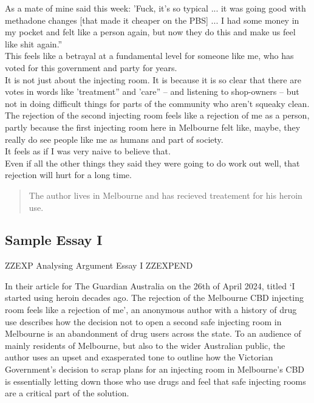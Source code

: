 \documentclass[a4paper]{article}
\begin{document}
As a mate of mine said this week: 'Fuck, it’s so typical ... it was going good with methadone changes [that made it cheaper on the PBS] ... I had some money in my pocket and felt like a person again, but now they do this and make us feel like shit again.”\\

This feels like a betrayal at a fundamental level for someone like me, who has voted for this government and party for years.\\

It is not just about the injecting room. It is because it is so clear that there are votes in words like 'treatment” and 'care” – and listening to shop-owners – but not in doing difficult things for parts of the community who aren’t squeaky clean.\\

The rejection of the second injecting room feels like a rejection of me as a person, partly because the first injecting room here in Melbourne felt like, maybe, they really do see people like me as humans and part of society.\\

It feels as if I was very naive to believe that.\\

Even if all the other things they said they were going to do work out well, that rejection will hurt for a long time.\\

\begin{quote}
    The author lives in Melbourne and has recieved treatement for his heroin use.
\end{quote}

\newpage



\subsection{Sample Essay I}


ZZEXP Analysing Argument Essay I ZZEXPEND


In their article for The Guardian Australia on the 26th of April 2024, titled ‘I started using heroin decades ago. The rejection of the Melbourne CBD injecting room feels like a rejection of me’, an anonymous author with a history of drug use describes how the decision not to open a second safe injecting room in Melbourne is an abandonment of drug users across the state. To an audience of mainly residents of Melbourne, but also to the wider Australian public, the author uses an upset and exasperated tone to outline how the Victorian Government’s decision to scrap plans for an injecting room in Melbourne’s CBD is essentially letting down those who use drugs and feel that safe injecting rooms are a critical part of the solution.\\
\end{document}
